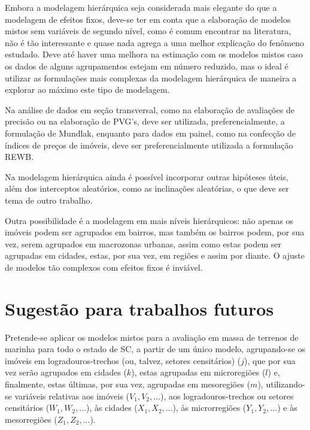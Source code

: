 \documentclass[
  a4paper, 11pt]{article}
\begin{document}
Embora a modelagem hierárquica seja considerada mais elegante do que a
modelagem de efeitos fixos, deve-se ter em conta que a elaboração de
modelos mistos sem variáveis de segundo nível, como é comum encontrar na
literatura, não é tão interessante e quase nada agrega a uma melhor
explicação do fenômeno estudado. Deve até haver uma melhora na estimação
com os modelos mistos caso os dados de alguns agrupamentos estejam em
número reduzido, mas o ideal é utilizar as formulações mais complexas da
modelagem hierárquica de maneira a explorar ao máximo este tipo de
modelagem.

Na análise de dados em seção transversal, como na elaboração de
avaliações de precisão ou na elaboração de PVG's, deve ser utilizada,
preferencialmente, a formulação de Mundlak, enquanto para dados em
painel, como na confecção de índices de preços de imóveis, deve ser
preferencialmente utilizada a formulação REWB.

Na modelagem hierárquica ainda é possível incorporar outras hipóteses
úteis, além dos interceptos aleatórios, como as inclinações aleatórias,
o que deve ser tema de outro trabalho.

Outra possibilidade é a modelagem em mais níveis hierárquicos: não
apenas os imóveis podem ser agrupados em bairros, mas também os bairros
podem, por sua vez, serem agrupados em macrozonas urbanas, assim como
estas podem ser agrupadas em cidades, estas, por sua vez, em regiões e
assim por diante. O ajuste de modelos tão complexos com efeitos fixos é
inviável.

\hypertarget{sugestuxe3o-para-trabalhos-futuros}{%
\section{Sugestão para trabalhos
futuros}\label{sugestuxe3o-para-trabalhos-futuros}}

Pretende-se aplicar os modelos mistos para a avaliação em massa de
terrenos de marinha para todo o estado de SC, a partir de um único
modelo, agrupando-se os imóveis em logradouros-trechos (ou, talvez,
setores censitários) (\(j\)), que por sua vez serão agrupados em cidades
(\(k\)), estas agrupadas em microregiões (\(l\)) e, finalmente, estas
últimas, por sua vez, agrupadas em mesoregiões (\(m\)), utilizando-se
variáveis relativas aos imóveis (\(V_1, V_2,...\)), aos
logradouros-trechos ou setores censitários (\(W_1, W_2, ...\)), às
cidades (\(X_1, X_2, ...\)), às microrregiões (\(Y_1, Y_2, ...\)) e às
mesorregiões (\(Z_1, Z_2, ...\)).
\end{document}
